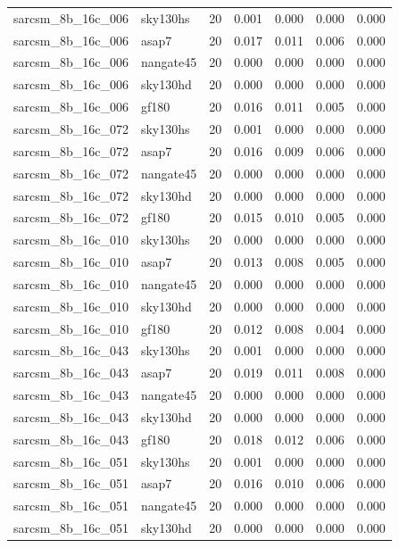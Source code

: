 \begin{tabular}{llrrrrr}
sarcsm\_8b\_16c\_006 & sky130hs & 20 & 0.001 & 0.000 & 0.000 & 0.000 \\
sarcsm\_8b\_16c\_006 & asap7 & 20 & 0.017 & 0.011 & 0.006 & 0.000 \\
sarcsm\_8b\_16c\_006 & nangate45 & 20 & 0.000 & 0.000 & 0.000 & 0.000 \\
sarcsm\_8b\_16c\_006 & sky130hd & 20 & 0.000 & 0.000 & 0.000 & 0.000 \\
sarcsm\_8b\_16c\_006 & gf180 & 20 & 0.016 & 0.011 & 0.005 & 0.000 \\
sarcsm\_8b\_16c\_072 & sky130hs & 20 & 0.001 & 0.000 & 0.000 & 0.000 \\
sarcsm\_8b\_16c\_072 & asap7 & 20 & 0.016 & 0.009 & 0.006 & 0.000 \\
sarcsm\_8b\_16c\_072 & nangate45 & 20 & 0.000 & 0.000 & 0.000 & 0.000 \\
sarcsm\_8b\_16c\_072 & sky130hd & 20 & 0.000 & 0.000 & 0.000 & 0.000 \\
sarcsm\_8b\_16c\_072 & gf180 & 20 & 0.015 & 0.010 & 0.005 & 0.000 \\
sarcsm\_8b\_16c\_010 & sky130hs & 20 & 0.000 & 0.000 & 0.000 & 0.000 \\
sarcsm\_8b\_16c\_010 & asap7 & 20 & 0.013 & 0.008 & 0.005 & 0.000 \\
sarcsm\_8b\_16c\_010 & nangate45 & 20 & 0.000 & 0.000 & 0.000 & 0.000 \\
sarcsm\_8b\_16c\_010 & sky130hd & 20 & 0.000 & 0.000 & 0.000 & 0.000 \\
sarcsm\_8b\_16c\_010 & gf180 & 20 & 0.012 & 0.008 & 0.004 & 0.000 \\
sarcsm\_8b\_16c\_043 & sky130hs & 20 & 0.001 & 0.000 & 0.000 & 0.000 \\
sarcsm\_8b\_16c\_043 & asap7 & 20 & 0.019 & 0.011 & 0.008 & 0.000 \\
sarcsm\_8b\_16c\_043 & nangate45 & 20 & 0.000 & 0.000 & 0.000 & 0.000 \\
sarcsm\_8b\_16c\_043 & sky130hd & 20 & 0.000 & 0.000 & 0.000 & 0.000 \\
sarcsm\_8b\_16c\_043 & gf180 & 20 & 0.018 & 0.012 & 0.006 & 0.000 \\
sarcsm\_8b\_16c\_051 & sky130hs & 20 & 0.001 & 0.000 & 0.000 & 0.000 \\
sarcsm\_8b\_16c\_051 & asap7 & 20 & 0.016 & 0.010 & 0.006 & 0.000 \\
sarcsm\_8b\_16c\_051 & nangate45 & 20 & 0.000 & 0.000 & 0.000 & 0.000 \\
sarcsm\_8b\_16c\_051 & sky130hd & 20 & 0.000 & 0.000 & 0.000 & 0.000 \\

\end{tabular}
